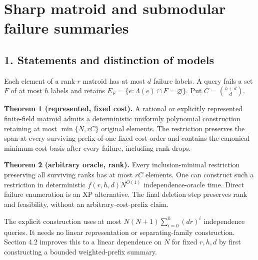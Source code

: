 
\hypertarget{af-240b5086c5-sharp-matroid-and-submodular-failure-summaries}{%
\section{Sharp matroid and submodular failure summaries}\label{af-240b5086c5-sharp-matroid-and-submodular-failure-summaries}}

\hypertarget{af-240b5086c5-statements-and-distinction-of-models}{%
\subsection{1. Statements and distinction of models}\label{af-240b5086c5-statements-and-distinction-of-models}}

Each element of a rank-\(r\) matroid has at most \(d\) failure labels. A query fails a set \(F\) of at most \(h\) labels and retains \(E_F=\{e:\Lambda(e)\cap F=\varnothing\}\). Put \(C=\binom{h+d}{d}\).

\textbf{Theorem 1 (represented, fixed cost).} A rational or explicitly represented finite-field matroid admits a deterministic uniformly polynomial construction retaining at most \(\min\{N,rC\}\) original elements. The restriction preserves the span at every surviving prefix of one fixed cost order and contains the canonical minimum-cost basis after every failure, including rank drops.

\textbf{Theorem 2 (arbitrary oracle, rank).} Every inclusion-minimal restriction preserving all surviving ranks has at most \(rC\) elements. One can construct such a restriction in deterministic \(f(r,h,d)N^{O(1)}\) independence-oracle time. Direct failure enumeration is an XP alternative. The final deletion step preserves rank and feasibility, without an arbitrary-cost-prefix claim.

The explicit construction uses at most \(N(N+1)\sum_{i=0}^{h}(dr)^i\) independence queries. It needs no linear representation or separating-family construction. Section 4.2 improves this to a linear dependence on \(N\) for fixed \(r,h,d\) by first constructing a bounded weighted-prefix summary.

